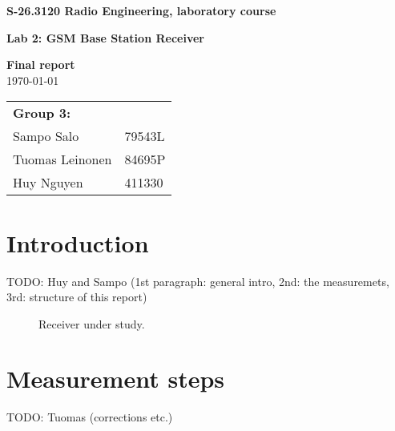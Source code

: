 \documentclass[a4paper, 12pt]{article}
\begin{document}
\begin{titlepage}
\pagestyle{empty}
\begin{center}

\vspace*{3cm}
\noindent\LARGE{\textbf{S-26.3120 Radio Engineering, laboratory course}}

\vspace*{2cm}

\Large{\textbf{Lab 2: GSM Base Station Receiver}}\\

\vspace*{1.5cm}

\large{\textbf{Final report}}\\
\vspace{1.5cm}
\large{\today}
	
\vspace*{3cm}
\large{
	\begin{tabular}{l l}
		\textbf{Group 3:} 	& \\
		Sampo Salo			& 79543L	\\
		Tuomas Leinonen 	& 84695P	\\
		Huy Nguyen			& 411330		
	\end{tabular}
}

\end{center}

\end{titlepage}


\section{Introduction}

TODO: Huy and Sampo (1st paragraph: general intro, 2nd: the measuremets, 3rd: structure of this report)


\begin{figure}[h!]
	\begin{center}
	\caption{Receiver under study.}
	\label{fig:bs}
	\end{center}
	\vspace*{-12pt}
\end{figure}


\newpage
\section{Measurement steps}

TODO: Tuomas (corrections etc.)
\end{document}
